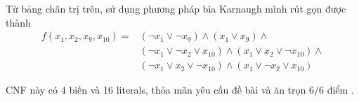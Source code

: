 Từ bảng chân trị trên, sử dụng phương pháp bìa Karnaugh mình rút gọn được thành
\begin{align*}
    f(x_1, x_2, x_9, x_{10}) = & (\lnot x_1 \lor \lnot x_9) \land (x_1 \lor x_9) \land \\ 
    & (\lnot x_1 \lor \lnot x_2 \lor x_{10}) \land (x_1 \lor x_2 \lor \lnot x_{10}) \land \\
    & (\lnot x_1 \lor x_2 \lor \lnot x_{10}) \land (x_1 \lor \lnot x_2 \lor x_{10})
\end{align*}

CNF này có 4 biến và 16 literals, thỏa mãn yêu cầu đề bài và ăn trọn 6/6 điểm .

